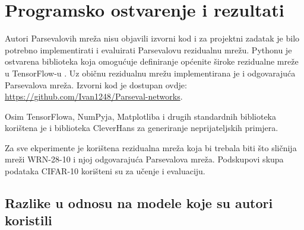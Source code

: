 \documentclass[utf8, seminar, numeric, lmodern]{feri}
\begin{document}
\chapter{Programsko ostvarenje i rezultati} \label{chap:prog}

Autori Parsevalovih mreža \cite{cisse17-pn} nisu objavili izvorni kod i za projektni zadatak je bilo potrebno implementirati i evaluirati Parsevalovu rezidualnu mrežu. Pythonu je ostvarena biblioteka koja omogućuje definiranje općenite široke rezidualne mreže \cite{he15-resnet,he16-resnet-imdrn,zagoruyko16-wrn} u TensorFlow-u \cite{tensorflow2015-whitepaper}. Uz običnu rezidualnu mrežu implementirana je i odgovarajuća Parsevalova mreža. Izvorni kod je dostupan ovdje: \url{https://github.com/Ivan1248/Parseval-networks}.

Osim TensorFlowa, NumPyja, Matplotliba i drugih standardnih biblioteka korištena je i biblioteka CleverHans \cite{papernot2016cleverhans} za generiranje neprijateljskih primjera.

Za sve ekperimente je korištena rezidualna mreža koja bi trebala biti što sličnija mreži WRN-28-10 \cite{zagoruyko16-wrn} i njoj odgovarajuća Parsevalova mreža. Podskupovi skupa podataka CIFAR-10 korišteni su za učenje i evaluaciju.

\section{Razlike u odnosu na modele koje su autori koristili}
\end{document}
